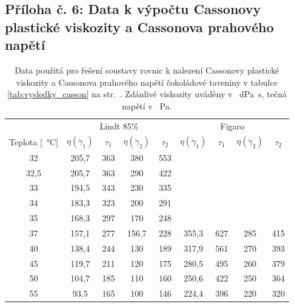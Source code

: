 \documentclass[12pt]{article}
\begin{document}
\subsection*{Příloha č. 6: Data k výpočtu Cassonovy plastické viskozity a Cassonova prahového napětí}
\begin{table}[h!]
    \centering
    \begin{tabular}{|c|c c c c|c c c c|}
        \hline
        & \multicolumn{4}{c|}{Lindt 85\%} & \multicolumn{4}{c|}{Figaro}\\
        Teplota [\SI{}{\degreeCelsius}] & $\eta(\dot\gamma_1)$ & $\tau_1$ & $\eta(\dot\gamma_2)$ & $\tau_2$ & $\eta(\dot\gamma_1)$ & $\tau_1$ & $\eta(\dot\gamma_2)$ & $\tau_2$ \\\hline
        32 & 205,7 & 363 & 380 & 553 & & & &\\
        32,5 & 205,7 & 363 & 290 & 422 & & & &\\
        33 & 194,5 & 343 & 230 & 335 & & & &\\
        34 & 183,3 & 323 & 200 & 291 & & & &\\
        35 & 168,3 & 297 & 170 & 248 & & & &\\
        37 & 157,1 & 277 & 156,7 & 228 & 355,3 & 627 & 285 & 415\\
        40 & 138,4 & 244 & 130 & 189 & 317,9 & 561 & 270 & 393\\
        45 & 119,7 & 211 & 120 & 175 & 280,5 & 495 & 260 & 379\\
        50 & 104,7 & 185 & 110 & 160 & 250,6 & 422 & 250 & 364\\
        55 & 93,5 & 165 & 100 & 146 & 224,4 & 396 & 220 & 320\\\hline       
    \end{tabular}
    \caption{Data použitá pro řešení soustavy rovnic k nalezení Cassonovy plastické viskozity a Cassonova prahového napětí čokoládové taveniny v tabulce \ref{tab:vysledky_casson} na str.~\pageref{tab:vysledky_casson}. Zdánlivé viskozity uváděny v \SI{}{\deci\pascal\second}, tečná napětí v \SI{}{\pascal}.}
    \label{tab:vypocet_casson}
\end{table}
\end{document}
